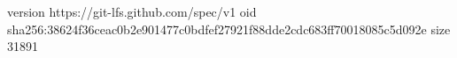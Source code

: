 version https://git-lfs.github.com/spec/v1
oid sha256:38624f36ceac0b2e901477c0bdfef27921f88dde2cdc683ff70018085c5d092e
size 31891
